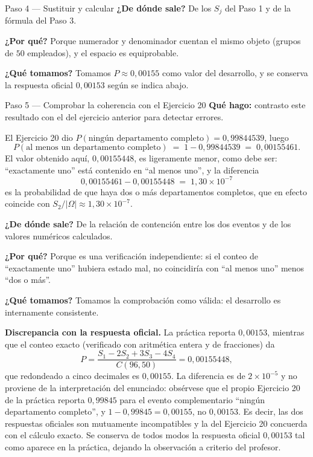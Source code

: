 \documentclass[11pt]{article}
\begin{document}
\begin{sol}
\begin{paso}{Paso 4 --- Sustituir y calcular}
\textbf{¿De d\'onde sale?} De los $S_j$ del Paso 1 y de la f\'ormula del Paso 3.

\textbf{¿Por qu\'e?} Porque numerador y denominador cuentan el mismo objeto (grupos de $50$ empleados), y el espacio es equiprobable.

\textbf{¿Qu\'e tomamos?} Tomamos $P\approx 0{,}00155$ como valor del desarrollo, y se conserva la respuesta oficial $0{,}00153$ seg\'un se indica abajo.
\end{paso}

\begin{paso}{Paso 5 --- Comprobar la coherencia con el Ejercicio 20}
\textbf{Qu\'e hago:} contrasto este resultado con el del ejercicio anterior para detectar errores.

El Ejercicio 20 dio $P(\text{ning\'un departamento completo})=0{,}99844539$, luego
\[
P(\text{al menos un departamento completo}) \;=\; 1-0{,}99844539 \;=\; 0{,}00155461 .
\]
El valor obtenido aqu\'i, $0{,}00155448$, es ligeramente menor, como debe ser: ``exactamente uno'' est\'a contenido en ``al menos uno'', y la diferencia
\[
0{,}00155461-0{,}00155448 \;=\; 1{,}30\times 10^{-7}
\]
es la probabilidad de que haya dos o m\'as departamentos completos, que en efecto coincide con $S_2/|\Omega|\approx 1{,}30\times 10^{-7}$.

\textbf{¿De d\'onde sale?} De la relaci\'on de contenci\'on entre los dos eventos y de los valores num\'ericos calculados.

\textbf{¿Por qu\'e?} Porque es una verificaci\'on independiente: si el conteo de ``exactamente uno'' hubiera estado mal, no coincidir\'ia con ``al menos uno'' menos ``dos o m\'as''.

\textbf{¿Qu\'e tomamos?} Tomamos la comprobaci\'on como v\'alida: el desarrollo es internamente consistente.
\end{paso}

\begin{nota}
\textbf{Discrepancia con la respuesta oficial.} La pr\'actica reporta $0{,}00153$, mientras que el conteo exacto (verificado con aritm\'etica entera y de fracciones) da
\[
P=\frac{S_1-2S_2+3S_3-4S_4}{C(96,50)}=0{,}00155448 ,
\]
que redondeado a cinco decimales es $0{,}00155$. La diferencia es de $2\times 10^{-5}$ y no proviene de la interpretaci\'on del enunciado: obs\'ervese que el propio Ejercicio 20 de la pr\'actica reporta $0{,}99845$ para el evento complementario ``ning\'un departamento completo'', y $1-0{,}99845=0{,}00155$, no $0{,}00153$. Es decir, las dos respuestas oficiales son mutuamente incompatibles y la del Ejercicio 20 concuerda con el c\'alculo exacto. Se conserva de todos modos la respuesta oficial $0{,}00153$ tal como aparece en la pr\'actica, dejando la observaci\'on a criterio del profesor.
\end{nota}

\end{sol}
\end{document}
